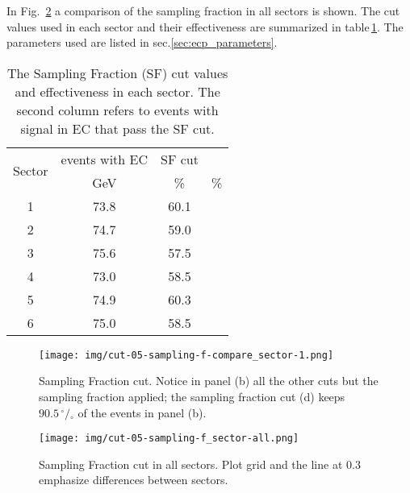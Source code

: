 In Fig.~\ref{fig:ecp_all_sectors} a comparison of the sampling fraction in all sectors is shown.
The cut values used in each sector and their effectiveness are summarized in 
table\,\ref{tab:sfcut}. The parameters used are listed in sec.\ref{sec:ecp_parameters}.

\begin{table}[h]
\label{tab:sfcut}
	\begin{center}
		\begin{tabular}{c | c | c | c}
			\hline 
			\multirow{2}{*}{Sector} 
					& events with EC & SF cut\\
					&  GeV & \% & \% \\
			\hline
			1   & 73.8 & 60.1 \\
			2   & 74.7 & 59.0 \\
			3   & 75.6 & 57.5 \\
			4   & 73.0 & 58.5 \\
			5   & 74.9 & 60.3 \\
			6   & 75.0 & 58.5 \\
			\hline 
		\end{tabular}
		\caption{The Sampling Fraction (SF) cut values and effectiveness in each sector.
					The second column refers to events with signal in EC that pass the SF cut.}	
	\end{center}
\end{table}


\begin{figure}[ht]
  \centering
		\texttt{[image: img/cut-05-sampling-f-compare\_sector-1.png]}
		\caption{Sampling Fraction cut. Notice in panel (b) all the other cuts
        but the sampling fraction applied; the sampling fraction cut (d) keeps
		$90.5\,^{\circ\!\!}/\!_\circ$ of the events in panel (b).}
 		\label{fig:sampling_fractioncut_s1}
\end{figure}

\clearpage

\begin{figure}[ht]
  \centering
		\texttt{[image: img/cut-05-sampling-f\_sector-all.png]}
		\caption{Sampling Fraction cut in all sectors. Plot grid and 
					the line at 0.3 emphasize differences between sectors.}
 		\label{fig:ecp_all_sectors}
\end{figure}

